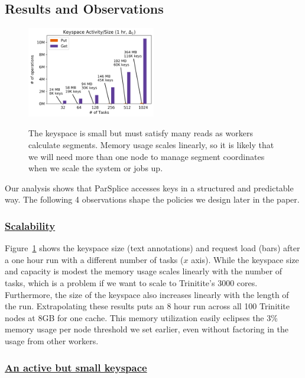 \subsection{Results and Observations}
\label{sec:parsplice-keyspace-analysis}

\begin{figure}[t]
  \noindent\includegraphics[width=0.5\textwidth]{figures/methodology-keyspace.png}\\
  \caption{The keyspace is small but must satisfy many reads as workers
  calculate segments. Memory usage scales linearly, so it is likely that we will need
  more than one node to manage segment coordinates when we scale the system or jobs up.
  \label{fig:methodology-keyspace}}
\end{figure}

Our analysis shows that ParSplice accesses keys in a structured and predictable
way. The following 4 observations shape the policies we design later in the
paper.

\subsubsection{\underline{Scalability}} Figure~\ref{fig:methodology-keyspace} shows the
keyspace size (text annotations) and request load (bars) after a one hour run
with a different number of tasks (\(x\) axis). While the keyspace size and
capacity is modest the memory usage scales linearly with the number
of tasks, which is a problem if we want to scale to Trinitite's 3000 cores.
Furthermore, the size of the keyspace also increases linearly with the length
of the run.  Extrapolating these results puts an 8 hour run across all 100
Trinitite nodes at 8GB for one cache.  This memory utilization easily eclipses
the 3\% memory usage per node threshold we set earlier, even without factoring
in the usage from other workers.

\subsubsection{\underline{An active but small keyspace}}

